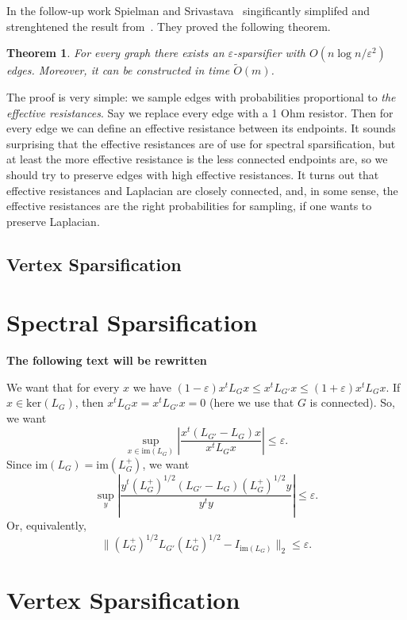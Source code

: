 \documentclass[12pt]{article}
\newcommand{\eps}{\varepsilon}
\newtheorem{theorem}{Theorem}
\begin{document}
    In the follow-up work Spielman and Srivastava~\cite{SS11} singificantly simplifed
    and strenghtened the result from~\cite{ST11}.
    They proved the following theorem.
    \begin{theorem}
        For every graph there exists an $\eps$-sparsifier with $O(n \log n / \eps^2)$
        edges. Moreover, it can be constructed in time $\tilde{O}(m)$.
    \end{theorem}
    The proof is very simple: we sample edges with probabilities proportional to
    \emph{the effective resistances}. Say we replace every edge with a 1 Ohm resistor.
    Then for every edge we can define an effective resistance between its endpoints.
    It sounds surprising that the effective resistances are of use for spectral
    sparsification, but at least the more effective resistance is the less connected
    endpoints are, so we should try to preserve edges with high effective resistances.
    It turns out that effective resistances and Laplacian are closely connected, and,
    in some sense, the effective resistances are the right probabilities for sampling,
    if one wants to preserve Laplacian.
    \subsection{Vertex Sparsification}
    \section{Spectral Sparsification}
    \textbf{The following text will be rewritten}

    We want that for every $x$ we have $(1 - \eps) x^t L_G x \leq x^t L_{G'} x \leq (1 + \eps) x^t L_G x$.
    If $x \in \mathrm{ker}(L_G)$, then $x^t L_G x = x^t L_{G'} x = 0$ (here we use that $G$ is connected).
    So, we want
    $$
        \sup_{x \in \mathrm{im}(L_G)} \left|\frac{x^t (L_{G'} - L_G) x}{x^t L_G x} \right| \leq \eps.
    $$
    Since $\mathrm{im}(L_G) = \mathrm{im}(L_G^+)$, we want
    $$
        \sup_{y} \left|\frac{y^t (L_G^+)^{1/2} (L_{G'} - L_G) (L_G^+)^{1/2} y}{y^t y}\right| \leq \eps.
    $$
    Or, equivalently,
    $$
        \|(L_G^+)^{1/2} L_{G'} (L_G^+)^{1/2} - I_{\mathrm{im}(L_G)}\|_2 \leq \eps.
    $$

    \section{Vertex Sparsification}
    
    
\end{document}
